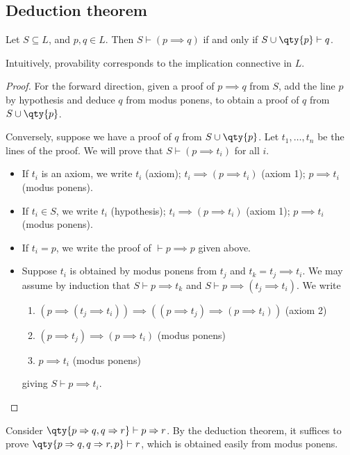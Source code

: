 \subsection{Deduction theorem}
\begin{theorem}
    Let $S \subseteq L$, and $p, q \in L$.
    Then $S \vdash (p \implies q)$ if and only if $S \cup \qty{p} \vdash q$.
\end{theorem}
Intuitively, provability corresponds to the implication connective in $L$.
\begin{proof}
    For the forward direction, given a proof of $p \implies q$ from $S$, add the line $p$ by hypothesis and deduce $q$ from modus ponens, to obtain a proof of $q$ from $S \cup \qty{p}$.

    Conversely, suppose we have a proof of $q$ from $S \cup \qty{p}$.
    Let $t_1, \dots, t_n$ be the lines of the proof.
    We will prove that $S \vdash (p \implies t_i)$ for all $i$.
    \begin{itemize}
        \item If $t_i$ is an axiom, we write $t_i$ (axiom); $t_i \implies (p \implies t_i)$ (axiom 1); $p \implies t_i$ (modus ponens).
        \item If $t_i \in S$, we write $t_i$ (hypothesis); $t_i \implies (p \implies t_i)$ (axiom 1); $p \implies t_i$ (modus ponens).
        \item If $t_i = p$, we write the proof of $\vdash p \implies p$ given above.
        \item Suppose $t_i$ is obtained by modus ponens from $t_j$ and $t_k = t_j \implies t_i$.
        We may assume by induction that $S \vdash p \implies t_k$ and $S \vdash p \implies (t_j \implies t_i)$.
        We write
        \begin{enumerate}
            \item $(p \implies (t_j \implies t_i)) \implies ((p \implies t_j) \implies (p \implies t_i))$ (axiom 2)
            \item $(p \implies t_j) \implies (p \implies t_i)$ (modus ponens)
            \item $p \implies t_i$ (modus ponens)
        \end{enumerate}
        giving $S \vdash p \implies t_i$.
    \end{itemize}
\end{proof}
\begin{example}
    Consider $\qty{p \implies q, q \implies r} \vdash p \implies r$.
    By the deduction theorem, it suffices to prove $\qty{p \implies q, q \implies r, p} \vdash r$, which is obtained easily from modus ponens.
\end{example}

